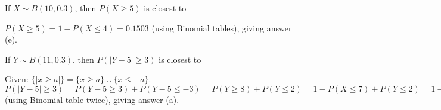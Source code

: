\documentclass[bigtut]{tutorial}
\begin{document}
\begin{tutorial}
\begin{questions}
\question
If $X \sim B(10,0.3)$, then $P(X \geq 5)$ is closest to
\begin{solution}
$P(X \geq 5) = 1- P(X \leq 4) =  0.1503$ (using Binomial tables), giving answer (e).
\end{solution}


\question
If $Y \sim B(11,0.3)$, then $P(|Y-5| \geq 3)$ is closest to
\begin{solution}
Given: $\{ |x \geq a| \}  = \{ x \geq a \} \cup \{ x \leq -a \}$. \\
$P(|Y-5| \geq 3) = P(Y-5 \geq 3) + P(Y-5 \leq -3) = P(Y \geq 8) + P(Y \leq 2) = 1-P(X \leq 7) + P(Y \leq 2) = 1 - 0.9957 + 0.3127 = 0.317$ (using Binomial table twice), giving answer (a).
\end{solution}




\end{questions}
\end{tutorial}
\end{document}
